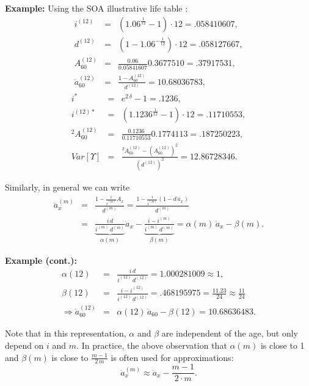 \documentclass[11pt,fleqn,oneside]{book}
\begin{document}
\noindent \textbf{Example:} Using the SOA illustrative life table :
\begin{eqnarray*}
i^{(12)} &=& \left(1.06^{\frac{1}{12}} - 1\right)\cdot 12 = .058410607,\\
d^{(12)} &=& \left(1 - 1.06^{-\frac{1}{12}}\right)\cdot 12 = .058127667,\\
A_{60}^{(12)} &= &\frac{0.06}{0.05841607}0.3677510 = .37917531,\\
\ddot{a}_{60}^{(12)} &=& \frac{1 - A_{60}^{(12)} }{d^{(12)}} = 10.68036783,
\end{eqnarray*}
\begin{eqnarray*}
i^* &=& e^{2\,\delta} -1 = .1236,\\
i^{(12)*} &=& \left(1.1236^{\frac{1}{12}} - 1\right)\cdot 12 = .11710553,\\
{^2A_{60}^{(12)}} &=& \frac{0.1236}{0.11710553}0.1774113 = .187250223,\\
Var[\Upsilon] &=& \frac{{^2A_{60}^{(12)}} - \left(A_{60}^{(12)}\right)^2}{\left(d^{(12)}\right)^2}
=12.86728346.
\end{eqnarray*}

Similarly, in general we can write
\begin{eqnarray*}
\ddot{a}_x^{(m)}  &=& \frac{1 - \frac{i}{i^{(m)}}A_x}{d^{(m)}} =  \frac{1 - \frac{i}{i^{(m)}}\left(1-d\,\ddot{a}_x\right)}{d^{(m)}}\\
&=& \underbrace{\frac{i\,d}{i^{(m)}\,d^{(m)}}}_{\alpha(m)} \ddot{a}_x
- \underbrace{\frac{i - i^{(m)}}{i^{(m)}\,d^{(m)}}}_{\beta(m)} =\alpha(m) \, \ddot{a}_x - \beta(m).
\end{eqnarray*}

\noindent \textbf{Example (cont.):}
\begin{eqnarray*}
\alpha(12) &=& \frac{i\,d}{i^{(12)}\,d^{(12)}} = 1.000281009 \approx 1,\\
\beta(12) &=& \frac{i - i^{(12)}}{i^{(12)}\,d^{(12)}} = .468195975 = \frac{11.23}{24} \approx \frac{11}{24}\\
\Rightarrow \ddot{a}_{60}^{(12)} &=&\alpha(12) \, \ddot{a}_{60} - \beta(12) = 10.68636483.
\end{eqnarray*}

Note that in this representation, $\alpha$ and $\beta$ are independent of the age, but only depend on $i$ and $m$. In practice, the above observation that $\alpha(m)$ is close to 1 and $\beta(m)$ is close to $\frac{m-1}{2\,m}$ is often used for approximations:
$$
\ddot{a}_x^{(m)} \approx \ddot{a}_x - \frac{m-1}{2\cdot m}.
$$
\end{document}
